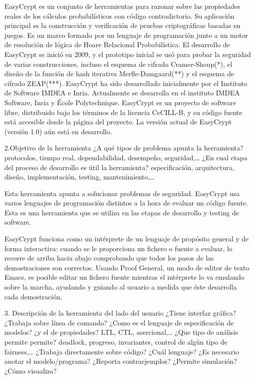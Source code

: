 \documentclass[runningheads,a4paper]{llncs}
\begin{document}
EasyCrypt es un conjunto de herramientas para razonar sobre las propiedades reales de los cálculos probabilísticos con código contradictorio. Su aplicación principal es la construcción y verificación de pruebas criptográficas basadas en juegos. 
Es un marco formado por un lenguaje de programación junto a un motor de resolución de lógica de Hoare Relacional Probabilística. El desarrollo de EasyCrypt se inició en 2009, y el prototipo inicial se usó para probar la seguridad de varias construcciones, incluso el esquema de cifrado Cramer-Shoup(*), el diseño de la función de hash iterativa Merfle-Damgaard(**) y el esquema de cifrado ZEAP(***). EasyCrypt ha sido desarrollado inicialmente por el Instituto de Software IMDEA e Inria. Actualmente se desarrolla en el instituto IMDEA Software, Inria y École Polytechnique. EasyCrypt es un proyecto de software libre, distribuido bajo los términos de la licencia CeCILL-B, y su código fuente está accesible desde la página del proyecto. 
La versión actual de EasyCrypt (versión 1.0) aún está en desarrollo. 

2.Objetivo de la herramienta 
¿A qué tipos de problema apunta la herramienta? protocolos, tiempo real, dependabilidad, desempeño, seguridad,… 
¿En cual etapa del proceso de desarrollo es útil la herramienta? especificación, arquitectura, diseño, implementación, testing, mantenimiento,…

Esta herramienta apunta a solucionar problemas de seguridad. EasyCrypt usa varios lenguajes de programación distintos a la hora de evaluar un código fuente. Esta es una herramienta que se utiliza en las etapas de desarrollo y testing de software. 

EasyCrypt funciona como un intérprete de un lenguaje de propósito general y de forma interactiva: cuando se le proporciona un fichero o fuente a evaluar, lo recorre de arriba hacia abajo comprobando que todos los pasos de las demostraciones son correctos. Usando Proof General, un modo de editor de texto Emacs, es posible editar un fichero fuente mientras el intérprete lo va emulando sobre la marcha, ayudando y guiando al usuario a medida que éste desarrolla cada demostración. 

3. Descripción de la herramienta del lado del usuario 
¿Tiene interfaz gráfica? 
¿Trabaja sobre línea de comando? 
¿Como es el lenguaje de especificación de modelos? 
¿y el de propiedades? LTL, CTL, asercional,… 
¿Que tipo de análisis permite permite? deadlock, progreso, invariantes, control de algún tipo de fairness,… 
¿Trabaja directamente sobre código? ¿Cuál lenguaje? 
¿Es necesario anotar el modelo/programa?
¿Reporta contraejemplos? 
¿Permite simulación? 
¿Cómo visualiza?
\end{document}

